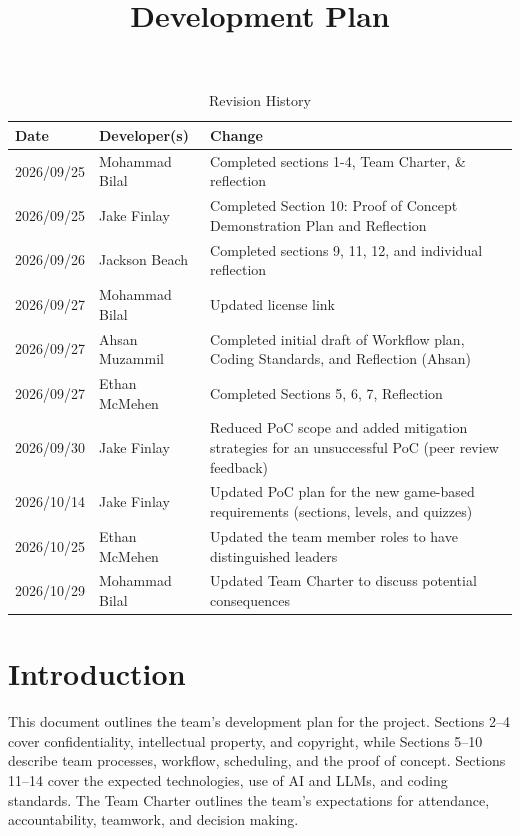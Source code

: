 \documentclass{article}
\title{Development Plan\\\progname}
\author{\authname}
\date{}
\begin{document}
\maketitle

\newpage{}

\begin{table}[hp]
\caption{Revision History} \label{TblRevisionHistory}
\begin{tabularx}{\textwidth}{llX}
\toprule
\textbf{Date} & \textbf{Developer(s)} & \textbf{Change}\\
\midrule
2026/09/25 & Mohammad Bilal & Completed sections 1-4, Team Charter, \& reflection \\
2026/09/25 & Jake Finlay & Completed Section 10: Proof of Concept Demonstration Plan and Reflection \\
2026/09/26 & Jackson Beach & Completed sections 9, 11, 12, and individual reflection \\
2026/09/27 & Mohammad Bilal & Updated license link \\
2026/09/27 & Ahsan Muzammil & Completed initial draft of Workflow plan, Coding Standards, and Reflection (Ahsan)\\
2026/09/27 & Ethan McMehen & Completed Sections 5, 6, 7, Reflection \\
2026/09/30 & Jake Finlay & Reduced PoC scope and added mitigation strategies for an unsuccessful PoC (peer review feedback) \\
2026/10/14 & Jake Finlay & Updated PoC plan for the new game-based requirements (sections, levels, and quizzes) \\
2026/10/25 & Ethan McMehen & Updated the team member roles to have distinguished leaders \\
2026/10/29 & Mohammad Bilal & Updated Team Charter to discuss potential consequences \\
\bottomrule
\end{tabularx}
\end{table}

\newpage{}

\section{Introduction}

This document outlines the team's development plan for the project.
Sections 2--4 cover confidentiality, intellectual property, and copyright,
while Sections 5--10 describe team processes, workflow, scheduling, and the proof of concept.
Sections 11--14 cover the expected technologies, use of AI and LLMs, and coding standards.
The Team Charter outlines the team's expectations for attendance, accountability, teamwork, and decision making.
\end{document}
